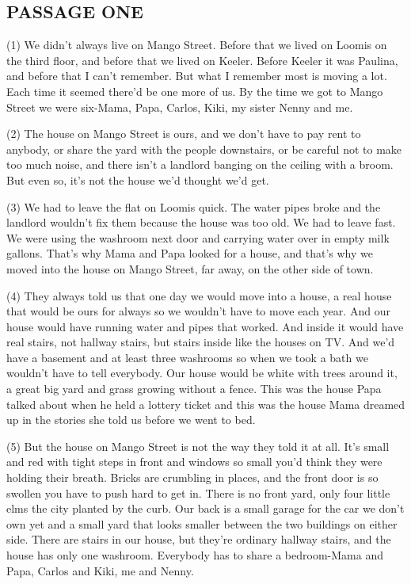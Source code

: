 \documentclass[UTF8,11pt]{ctexart}
\begin{document}
\subsection*{\textbf{PASSAGE ONE}}


(1) We didn’t always live on Mango Street. Before that we lived on Loomis on the third floor, and before that we lived on Keeler. Before Keeler it was Paulina, and before that I can’t remember. But what I remember most is moving a lot. Each time it seemed there’d be one more of us. By the time we got to Mango Street we were six-Mama, Papa, Carlos, Kiki, my sister Nenny and me.


(2) The house on Mango Street is ours, and we don’t have to pay rent to anybody, or share the yard with the people downstairs, or be careful not to make too much noise, and there isn’t a landlord banging on the ceiling with a broom. But even so, it’s not the house we’d thought we’d get.


(3) We had to leave the flat on Loomis quick. The water pipes broke and the landlord wouldn’t fix them because the house was too old. We had to leave fast. We were using the washroom next door and carrying water over in empty milk gallons. That’s why Mama and Papa looked for a house, and that’s why we moved into the house on Mango Street, far away, on the other side of town.


(4) They always told us that one day we would move into a house, a real house that would be ours for always so we wouldn’t have to move each year. And our house would have running water and pipes that worked. And inside it would have real stairs, not hallway stairs, but stairs inside like the houses on TV. And we’d have a basement and at least three washrooms so when we took a bath we wouldn’t have to tell everybody. Our house would be white with trees around it, a great big yard and grass growing without a fence. This was the house Papa talked about when he held a lottery ticket and this was the house Mama dreamed up in the stories she told us before we went to bed.


(5) But the house on Mango Street is not the way they told it at all. It’s small and red with tight steps in front and windows so small you’d think they were holding their breath. Bricks are crumbling in places, and the front door is so swollen you have to push hard to get in. There is no front yard, only four little elms the city planted by the curb. Our back is a small garage for the car we don’t own yet and a small yard that looks smaller between the two buildings on either side. There are stairs in our house, but they’re ordinary hallway stairs, and the house has only one washroom. Everybody has to share a bedroom-Mama and Papa, Carlos and Kiki, me and Nenny.
\end{document}
